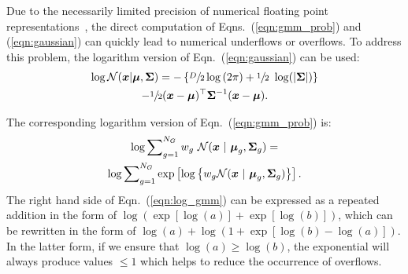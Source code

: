 Due to the necessarily limited precision of numerical floating point representations~\cite{Goldberg_1991,Monniaux_2008},
the direct computation of Eqns.~(\ref{eqn:gmm_prob}) and (\ref{eqn:gaussian}) can quickly lead to numerical underflows or overflows.
To address this problem, the logarithm version of Eqn.~(\ref{eqn:gaussian}) can be used:
%
\begin{multline}
  \log {{\mathcal{N}}}( {\boldsymbol{x}} | {\boldsymbol{\mu}}, {\boldsymbol{\Sigma}} )
  = -\left\{\sfrac{D}{2} \log \left( 2\pi \right)
  +
  \sfrac{1}{2} ~ \log ( |{\boldsymbol{\Sigma}}| )
  \right\} \\ - \sfrac{1}{2} ({\boldsymbol{x}}-{\boldsymbol{\mu}})^\top {\boldsymbol{\Sigma}}^{-1} ({\boldsymbol{x}}-{\boldsymbol{\mu}}).
\end{multline}

The corresponding logarithm version of Eqn.~(\ref{eqn:gmm_prob}) is:
%
\begin{multline}
\log \sum\nolimits_{g=1}^{N_G} w_g ~ {{\mathcal{N}}}( \Vec{x} ~|~ \Vec{\mu}_g, \Mat{\Sigma}_g )
 = \\
 \log \sum\nolimits_{g=1}^{N_G} \exp\left[ \log \left\{ w_g {{\mathcal{N}}}( \Vec{x} ~|~ \Vec{\mu}_g, \Mat{\Sigma}_g ) \right\} \right].
\label{eqn:log_gmm}
\end{multline}
The right hand side of Eqn.~(\ref{eqn:log_gmm}) can be expressed as a repeated addition in the form of \mbox{\small $\log(\exp\left[\log(a)\right] + \exp\left[\log(b)\right])$},
which can be rewritten in the form of \mbox{\small $\log(a) + \log\left( 1 + \exp\left[ \log(b) - \log(a) \right] \right)$}.
In the latter form, if we ensure that {\small $\log(a) \geq \log(b)$},
the exponential will always produce values $\leq 1$ which helps to reduce the occurrence of overflows.

